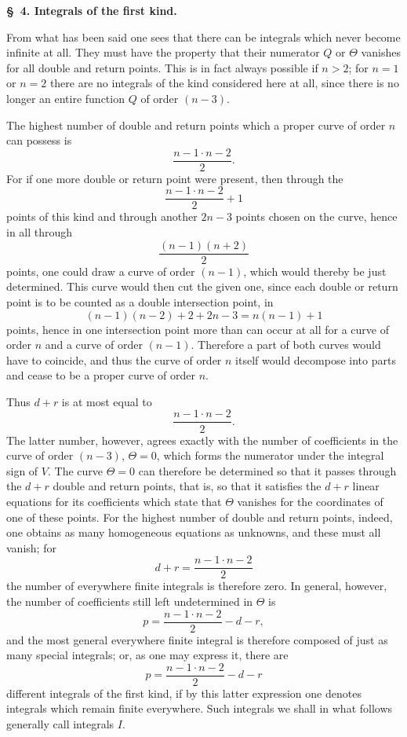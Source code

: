 \documentclass[10pt]{article}
\begin{document}
\begin{center}
{\bfseries \S\ 4. Integrals of the first kind.}
\end{center}

From what has been said one sees that there can be integrals which never become infinite at all. They must have the property that their numerator $Q$ or $\Theta$ vanishes for all double and return points. This is in fact always possible if $n>2$; for $n=1$ or $n=2$ there are no integrals of the kind considered here at all, since there is no longer an entire function $Q$ of order $(n-3)$.

The highest number of double and return points which a proper curve of order $n$ can possess is
\[
\frac{n-1\cdot n-2}{2}.
\]
For if one more double or return point were present, then through the
\[
\frac{n-1\cdot n-2}{2}+1
\]
points of this kind and through another $2n-3$ points chosen on the curve, hence in all through
\[
\frac{(n-1)(n+2)}{2}
\]
points, one could draw a curve of order $(n-1)$, which would thereby be just determined. This curve would then cut the given one, since each double or return point is to be counted as a double intersection point, in
\[
(n-1)(n-2)+2+2n-3=n(n-1)+1
\]
points, hence in one intersection point more than can occur at all for a curve of order $n$ and a curve of order $(n-1)$. Therefore a part of both curves would have to coincide, and thus the curve of order $n$ itself would decompose into parts and cease to be a proper curve of order $n$.

Thus $d+r$ is at most equal to
\[
\frac{n-1\cdot n-2}{2}.
\]
The latter number, however, agrees exactly with the number of coefficients in the curve of order $(n-3)$, $\Theta=0$, which forms the numerator under the integral sign of $V$. The curve $\Theta=0$ can therefore be determined so that it passes through the $d+r$ double and return points, that is, so that it satisfies the $d+r$ linear equations for its coefficients which state that $\Theta$ vanishes for the coordinates of one of these points. For the highest number of double and return points, indeed, one obtains as many homogeneous equations as unknowns, and these must all vanish; for
\[
d+r=\frac{n-1\cdot n-2}{2}
\]
the number of everywhere finite integrals is therefore zero. In general, however, the number of coefficients still left undetermined in $\Theta$ is
\[
p=\frac{n-1\cdot n-2}{2}-d-r,
\]
and the most general everywhere finite integral is therefore composed of just as many special integrals; or, as one may express it, there are
\[
p=\frac{n-1\cdot n-2}{2}-d-r
\]
different integrals of the first kind, if by this latter expression one denotes integrals which remain finite everywhere. Such integrals we shall in what follows generally call integrals $I$.
\end{document}
